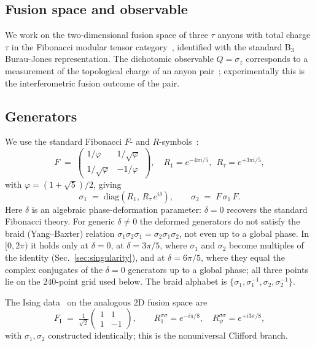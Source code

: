 \documentclass[aps,prx,reprint,amsmath,amssymb,floatfix,nofootinbib,superscriptaddress]{revtex4-2}
\begin{document}
\subsection{Fusion space and observable}

We work on the two-dimensional fusion space of three $\tau$ anyons
with total charge $\tau$ in the Fibonacci modular tensor
category~\cite{NayakSimonStern2008}, identified with the standard
B$_{3}$ Burau-Jones representation. The dichotomic observable
$Q = \sigma_{z}$ corresponds to a measurement of the topological
charge of an anyon pair~\cite{Bonderson2008}; experimentally this is
the interferometric fusion outcome of the pair.

\subsection{Generators}

We use the standard Fibonacci $F$- and $R$-symbols~\cite{NayakSimonStern2008}:
\begin{equation}
  F \;=\;
  \begin{pmatrix} 1/\varphi & 1/\sqrt{\varphi} \\
                  1/\sqrt{\varphi} & -1/\varphi \end{pmatrix},
  \quad
  R_{1} = e^{-4\pi i/5},\ \ R_{\tau} = e^{+3\pi i/5},
\end{equation}
with $\varphi = (1+\sqrt{5})/2$, giving
\begin{equation}
  \sigma_{1} \;=\; \mathrm{diag}(R_{1},\,R_{\tau}\,e^{i\delta}),
  \qquad
  \sigma_{2} \;=\; F\,\sigma_{1}\,F.
\end{equation}
Here $\delta$ is an algebraic phase-deformation parameter: $\delta=0$
recovers the standard Fibonacci theory. For generic $\delta \neq 0$ the
deformed generators do not satisfy the braid (Yang--Baxter) relation
$\sigma_{1}\sigma_{2}\sigma_{1} = \sigma_{2}\sigma_{1}\sigma_{2}$, not
even up to a global phase. In $[0, 2\pi)$ it holds only at $\delta = 0$,
at $\delta = 3\pi/5$, where $\sigma_{1}$ and $\sigma_{2}$ become
multiples of the identity (Sec.~\ref{sec:singularity}), and at $\delta =
6\pi/5$, where they equal the complex conjugates of the $\delta = 0$
generators up to a global phase; all three points lie on the $240$-point
grid used below. The braid alphabet is
$\{\sigma_{1},\sigma_{1}^{-1},\sigma_{2},\sigma_{2}^{-1}\}$.

The Ising data~\cite{NayakSimonStern2008} on the analogous $2$D
fusion space are
\begin{equation}
  F_{\mathrm{I}} \;=\; \tfrac{1}{\sqrt{2}}
  \begin{pmatrix} 1 & 1 \\ 1 & -1 \end{pmatrix},
  \qquad
  R^{\sigma\sigma}_{1} = e^{-i\pi/8},
  \quad
  R^{\sigma\sigma}_{\psi} = e^{+i 3\pi/8},
\end{equation}
with $\sigma_{1},\sigma_{2}$ constructed identically; this is the
nonuniversal Clifford branch.
\end{document}

